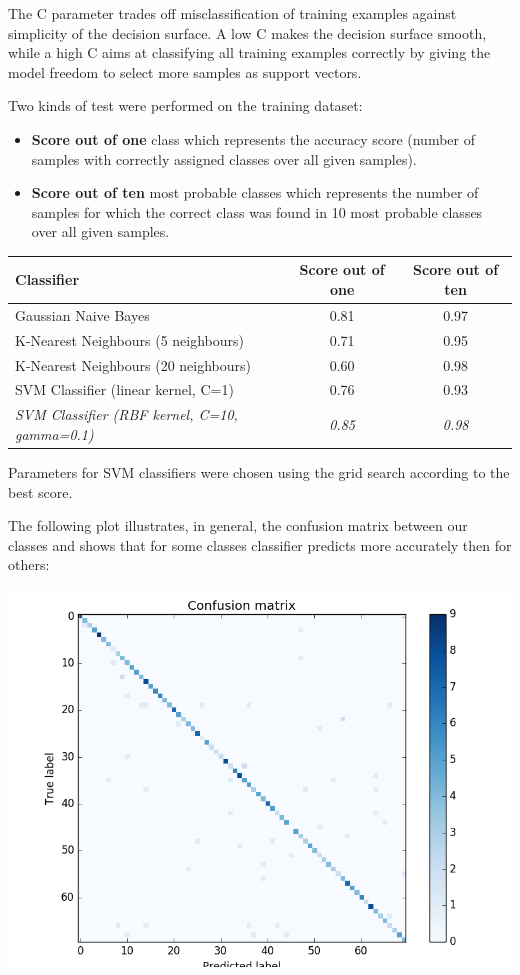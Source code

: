 \documentclass[12pt]{article}
\begin{document}
The C parameter trades off misclassification of training examples against simplicity of the decision surface. A low C makes the decision surface smooth, while a high C aims at classifying all training examples correctly by giving the model freedom to select more samples as support vectors.



Two kinds of test were performed on the training dataset:
\begin{itemize}
	\item \textbf{Score out of one} class which represents the accuracy score (number of samples with correctly assigned classes over all given samples).
	\item \textbf{Score out of ten} most probable classes which represents the number of samples for which the correct class was found in 10 most probable classes over all given samples.
\end{itemize}

\begin{center}
  \begin{tabular}{| l | c | c |}
    \hline
    \textbf{Classifier} & \textbf{Score out of one} & \textbf{Score out of ten}\\ \hline \hline
    Gaussian Naive Bayes & 0.81 & 0.97 \\ \hline
	K-Nearest Neighbours (5 neighbours) & 0.71 & 0.95\\ \hline
	K-Nearest Neighbours (20 neighbours) & 0.60 & 0.98 \\ \hline
	SVM Classifier (linear kernel, C=1) & 0.76 & 0.93 \\ \hline
	\textit{SVM Classifier (RBF kernel, C=10, gamma=0.1)} & \textit{0.85} & \textit{0.98} \\ 
	\hline
  \end{tabular}
\end{center}

Parameters for SVM classifiers were chosen using the grid search according to the best score.

The following plot illustrates, in general, the confusion matrix between our classes and shows that for some classes classifier predicts more accurately then for others:

\includegraphics[scale=0.6]{confusion_matrix.png} 
\end{document}
